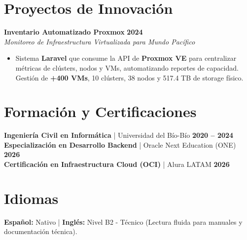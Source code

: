 \documentclass[a4paper,10pt]{article}
\begin{document}
\section{Proyectos de Innovación}

\noindent \textbf{Inventario Automatizado Proxmox} \hfill \textbf{2024} \\
\textit{Monitoreo de Infraestructura Virtualizada para Mundo Pacífico}
\begin{itemize}[leftmargin=*, noitemsep]
    \item Sistema \textbf{Laravel} que consume la API de \textbf{Proxmox VE} para centralizar métricas de clústers, nodos y VMs, automatizando reportes de capacidad. Gestión de \textbf{+400 VMs}, 10 clústers, 38 nodos y 517.4 TB de storage físico.
\end{itemize}

\section{Formación y Certificaciones}
\noindent \textbf{Ingeniería Civil en Informática} | Universidad del Bío-Bío \hfill \textbf{2020 -- 2024} \\
\noindent \textbf{Especialización en Desarrollo Backend} | Oracle Next Education (ONE) \hfill \textbf{2026} \\
\noindent \textbf{Certificación en Infraestructura Cloud (OCI)} | Alura LATAM \hfill \textbf{2026} 

\vspace{0.2cm}

\section{Idiomas}
\textbf{Español:} Nativo \quad | \quad \textbf{Inglés:} Nivel B2 - Técnico (Lectura fluida para manuales y documentación técnica).
\end{document}
